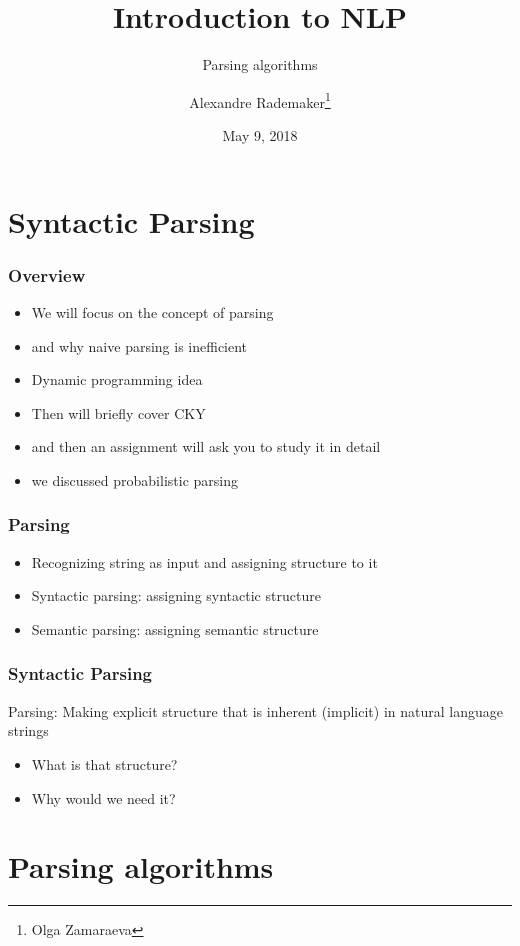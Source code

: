 \documentclass{beamer}
\title{Introduction to NLP}
\author{Alexandre Rademaker\thanks{Olga Zamaraeva}}
\institute{FGV/EMAp}
\subtitle{Parsing algorithms}
\date{May 9, 2018}
\begin{document}
   
\begin{frame}
  \maketitle
\end{frame}

\section{Syntactic Parsing}

\begin{frame}
\frametitle{Overview}
\begin{itemize}
\item We will focus on the concept of parsing
\item and why naive parsing is inefficient
\item Dynamic programming idea
\item Then will briefly cover CKY
\item and then an assignment will ask you to study it in detail
\item we discussed probabilistic parsing
\end{itemize}
\end{frame}

\begin{frame}
\frametitle{Parsing}
\begin{itemize}
\item Recognizing string as input and assigning structure to it
\item Syntactic parsing: assigning syntactic structure
\item Semantic parsing: assigning semantic structure
\end{itemize}
\end{frame}

\begin{frame}
\frametitle{Syntactic Parsing}

Parsing: Making explicit structure that is inherent (implicit) in natural language strings
\begin{itemize}
\item What is that structure?
\item Why would we need it?
\end{itemize}
\end{frame}

\section{Parsing algorithms}
\end{document}
